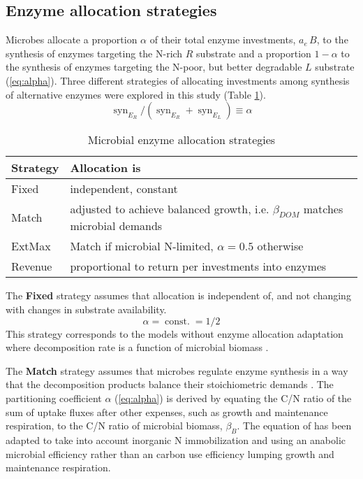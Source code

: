 \subsection{ Enzyme allocation strategies} 
\label{sec:AllocStrategies}

Microbes allocate a proportion $\alpha$ of their total enzyme investments,
$a_e\,B$, to the synthesis of enzymes targeting the N-rich $R$ substrate and
a proportion $1 - \alpha$ to the synthesis of enzymes targeting the N-poor, but
better degradable $L$ substrate (\ref{eq:alpha}). Three different strategies of
allocating investments among synthesis of alternative enzymes were explored in this study (Table
\ref{tab:AllocStrategies}).
\begin{equation} 
\label{eq:alpha}
\operatorname{syn}_{E_R} /
(\operatorname{syn}_{E_R} + \operatorname{syn}_{E_L}) \equiv \alpha
\end{equation}

\begin{table}[t]
\caption{Microbial enzyme allocation strategies \label{tab:AllocStrategies}}
\vskip4mm
\centering
\begin{tabular}{lp{6.5cm}}
\hline
Strategy &  Allocation is \\
\hline
Fixed & independent, constant \\
Match & adjusted to achieve balanced growth, i.e. $\beta_{DOM}$ matches
microbial demands  \\
ExtMax & Match if microbial N-limited, $\alpha=0.5$ otherwise \\
Revenue & proportional to return per investments into enzymes \\
\hline
\end{tabular}
\end{table}


The \textbf{Fixed} strategy assumes that allocation is independent of,
and not changing with changes in substrate availability.
\begin{equation} 
\label{eq:allocFixed}
\alpha = \operatorname{const.} = 1/2
\end{equation}
This strategy corresponds to the models without enzyme allocation adaptation
where decomposition rate is a function of microbial biomass \citep{Wutzler08}.
 
The \textbf{Match} strategy assumes that microbes regulate enzyme synthesis in a
way that the decomposition products balance their stoichiometric demands
\citep{Moorhead12}. The partitioning coefficient $\alpha$ (\ref{eq:alpha}) is
derived by equating the C/N ratio of the sum of uptake fluxes after
other expenses, such as growth and maintenance respiration, to the
C/N ratio of microbial biomass, $\beta_B$. The equation of \citep{Moorhead12}
has been adapted to take into account inorganic N immobilization and using an
anabolic microbial efficiency rather than an carbon use efficiency lumping
growth and maintenance respiration.

